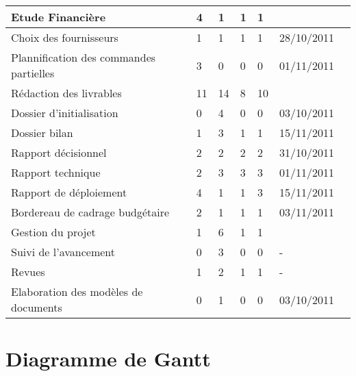 \begin{tabular}{|l|l|l|l|l|l|c|}
\rowcolor{Activite} Etude Financière & 4 & 1 & 1 & 1 & \\ \hline
Choix des fournisseurs & 1 & 1 & 1 & 1 & 28/10/2011 \\ \hline
Plannification des commandes partielles & 3 & 0 & 0 & 0 & 01/11/2011 \\ \hline

\rowcolor{Activite} Rédaction des livrables & 11 & 14 & 8 & 10 & \\ \hline
Dossier d'initialisation & 0 & 4 & 0 & 0 & 03/10/2011 \\ \hline
Dossier bilan & 1 & 3 & 1 & 1 & 15/11/2011 \\ \hline
Rapport décisionnel & 2 & 2 & 2 & 2 & 31/10/2011 \\ \hline
Rapport technique & 2 & 3 & 3 & 3 & 01/11/2011 \\ \hline
Rapport de déploiement & 4 & 1 & 1 & 3 & 15/11/2011 \\ \hline
Bordereau de cadrage budgétaire & 2 & 1 & 1 & 1 & 03/11/2011 \\ \hline

\rowcolor{Activite} Gestion du projet & 1 & 6 & 1 & 1 & \\ \hline
Suivi de l'avancement & 0 & 3 & 0 & 0 & - \\ \hline
Revues & 1 & 2 & 1 & 1 & - \\ \hline
Elaboration des modèles de documents & 0 & 1 & 0 & 0 & 03/10/2011 \\ \hline

\end{tabular}

\newpage
\section{Diagramme de Gantt}

